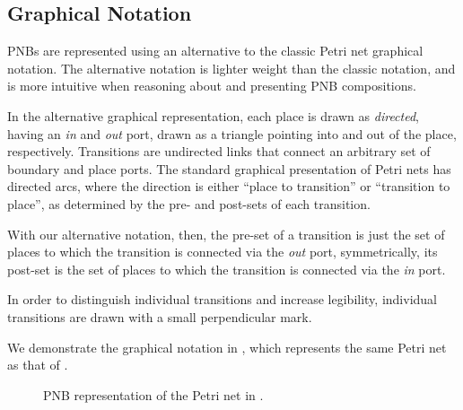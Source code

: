 \subsection{Graphical Notation}\label{sec:PNBgraphicalNotation}

PNBs are represented using an alternative to the classic Petri net graphical
notation. The alternative notation is lighter weight than the classic notation,
and is more intuitive when reasoning about and presenting PNB compositions.

In the alternative graphical representation, each place is drawn as
\emph{directed}, having an \textit{in} and \textit{out} port, drawn as a
triangle pointing into and out of the place, respectively. Transitions are
undirected links that connect an arbitrary set of boundary and place ports.
The standard graphical presentation of Petri nets has directed arcs, where the
direction is either ``place to transition'' or ``transition to place'', as
determined by the pre- and post-sets of each transition.

With our alternative notation, then, the pre-set of a transition is just the
set of places to which the transition is connected via the \textit{out} port,
symmetrically, its post-set is the set of places to which the
transition is connected via the \textit{in} port.

In order to distinguish individual transitions and increase legibility,
individual transitions are drawn with a small perpendicular mark.

We demonstrate the graphical notation in , which
represents the same Petri net as that of .

\begin{figure}[ht]
    \centering
    \caption{PNB representation of the Petri net in
    .}
    \label{fig:PNBExamplePetriNet}
\end{figure}

